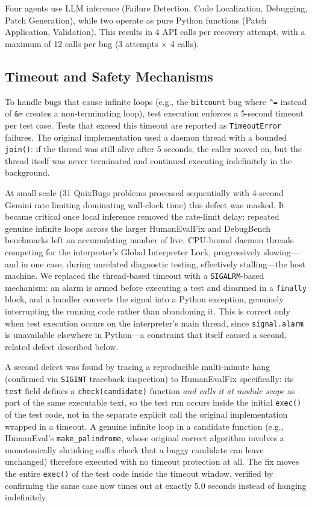 \documentclass[conference]{IEEEtran}
\begin{document}
Four agents use LLM inference (Failure Detection, Code Localization, Debugging, Patch Generation), while two operate as pure Python functions (Patch Application, Validation). This results in 4 API calls per recovery attempt, with a maximum of 12 calls per bug (3 attempts $\times$ 4 calls).

\subsection{Timeout and Safety Mechanisms}
\label{sec:timeout}
To handle bugs that cause infinite loops (e.g., the \texttt{bitcount} bug where \texttt{\^{}=} instead of \texttt{\&=} creates a non-terminating loop), test execution enforces a 5-second timeout per test case. Tests that exceed this timeout are reported as \texttt{TimeoutError} failures. The original implementation used a daemon thread with a bounded \texttt{join()}: if the thread was still alive after 5 seconds, the caller moved on, but the thread itself was never terminated and continued executing indefinitely in the background.

At small scale (31 QuixBugs problems processed sequentially with 4-second Gemini rate limiting dominating wall-clock time) this defect was masked. It became critical once local inference removed the rate-limit delay: repeated genuine infinite loops across the larger HumanEvalFix and DebugBench benchmarks left an accumulating number of live, CPU-bound daemon threads competing for the interpreter's Global Interpreter Lock, progressively slowing---and in one case, during unrelated diagnostic testing, effectively stalling---the host machine. We replaced the thread-based timeout with a \texttt{SIGALRM}-based mechanism: an alarm is armed before executing a test and disarmed in a \texttt{finally} block, and a handler converts the signal into a Python exception, genuinely interrupting the running code rather than abandoning it. This is correct only when test execution occurs on the interpreter's main thread, since \texttt{signal.alarm} is unavailable elsewhere in Python---a constraint that itself caused a second, related defect described below.

A second defect was found by tracing a reproducible multi-minute hang (confirmed via \texttt{SIGINT} traceback inspection) to HumanEvalFix specifically: its \texttt{test} field defines a \texttt{check(candidate)} function \emph{and calls it at module scope} as part of the same executable text, so the test run occurs inside the initial \texttt{exec()} of the test code, not in the separate explicit call the original implementation wrapped in a timeout. A genuine infinite loop in a candidate function (e.g., HumanEval's \texttt{make\_palindrome}, whose original correct algorithm involves a monotonically shrinking suffix check that a buggy candidate can leave unchanged) therefore executed with no timeout protection at all. The fix moves the entire \texttt{exec()} of the test code inside the timeout window, verified by confirming the same case now times out at exactly 5.0 seconds instead of hanging indefinitely.
\end{document}
